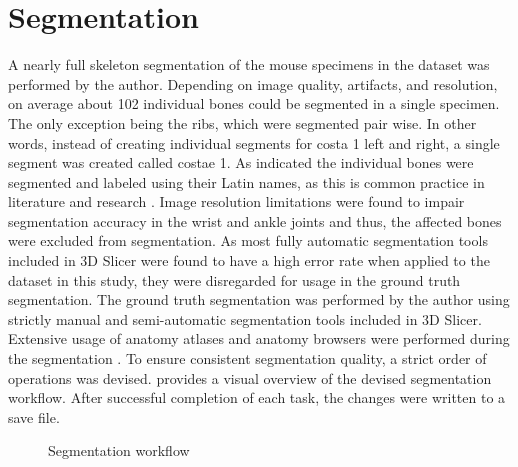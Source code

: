 \section{Segmentation}\label{s:segmentation}
A nearly full skeleton segmentation of the mouse specimens in the dataset was performed by the author.
Depending on image quality, artifacts, and resolution, on average about 102 individual bones could be segmented in a single specimen.
The only exception being the ribs, which were segmented pair wise.
In other words, instead of creating individual segments for costa 1 left and right, a single segment was created called costae 1.
As indicated the individual bones were segmented and labeled using their Latin names, as this is common practice in literature and research \cite{harrisonVertebralLandmarksIdentification2013,jeromeSkeletalSystem2018,ruberteMorphologicalMousePhenotyping2017,ruberteBridgingMouseHuman2023}.
Image resolution limitations were found to impair segmentation accuracy in the wrist and ankle joints and thus, the affected bones were excluded from segmentation.
As most fully automatic segmentation tools included in 3D Slicer were found to have a high error rate when applied to the dataset in this study, they were disregarded for usage in the ground truth segmentation.
The ground truth segmentation was performed by the author using strictly manual and semi-automatic segmentation tools included in 3D Slicer.
Extensive usage of anatomy atlases and anatomy browsers were performed during the segmentation \cite{jeromeSkeletalSystem2018,harrisonVertebralLandmarksIdentification2013,platzerTaschenatlasAnatomieBd2013,ruberteMorphologicalMousePhenotyping2017,ruberteBridgingMouseHuman2023,rautenkranzSectionalanatomy2018}.
To ensure consistent segmentation quality, a strict order of operations was devised.
 provides a visual overview of the devised segmentation workflow.
After successful completion of each task, the changes were written to a save file.
\begin{figure}[ht]
	\begin{center}
		
	\end{center}
	\caption{Segmentation workflow}\label{fig:segmentation-workflow}
\end{figure}

